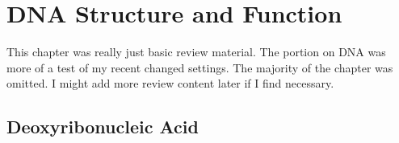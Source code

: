 \documentclass{inVerba-notes}
\begin{document}
\tableofcontents


\chapter{DNA Structure and Function}\label{DNA Basics}
\begin{adjustwidth}{1cm}{1cm}
  This chapter was really just basic review material. The portion on DNA was more of a test of my recent changed settings. The majority of the chapter was omitted. I might add more review content later if I find necessary.
\end{adjustwidth}

\section{Deoxyribonucleic Acid}\label{DNA}
\end{document}
